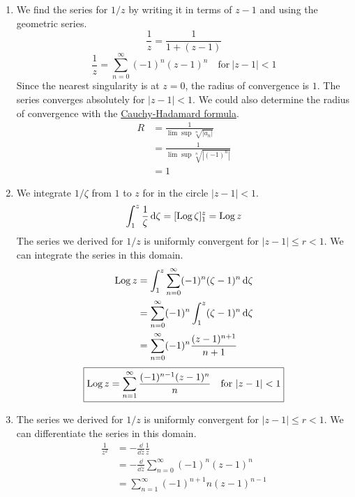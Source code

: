 {\begin{Solution}
  \label{solution taylor series 1/z}
  \begin{enumerate}
  \item
    We find the series for $1/z$ by writing it in terms of $z-1$ and using
    the geometric series.
    \[
    \frac{1}{z} = \frac{1}{1 + (z - 1)}
    \]
    \[
    \boxed{
      \frac{1}{z} = \sum_{n = 0}^\infty (-1)^n (z - 1)^n \quad \mathrm{for}\ |z-1| < 1
      }
    \]
    Since the nearest singularity is at $z = 0$, the radius of convergence 
    is $1$.  The series converges absolutely for $|z-1| < 1$.  We could 
    also determine the radius of convergence with the 
    \hyperref[result cauchy hadamard formula]{Cauchy-Hadamard formula}.
    \begin{align*}
      R
      &= \frac{ 1 }{ \lim \sup \sqrt[n]{|a_n|} } 
      \\
      &= \frac{ 1 }{ \lim \sup \sqrt[n]{|(-1)^n|} } 
      \\
      &= 1
    \end{align*}
  \item
    We integrate $1/\zeta$ from $1$ to $z$ for in the circle $|z - 1| < 1$.
    \[
    \int_1^z \frac{1}{\zeta}\,\mathrm{d} \zeta = [ \mathop{\mathrm{Log}}\nolimits \zeta ]_1^z = \mathop{\mathrm{Log}}\nolimits z
    \]
    The series we derived for $1/z$ is uniformly convergent for 
    $|z-1| \leq r < 1$.  We can integrate the series in this domain.
    \begin{align*}
      \mathop{\mathrm{Log}}\nolimits z
      &= \int_1^z \sum_{n = 0}^\infty (-1)^n (\zeta - 1)^n\,\mathrm{d} \zeta
      \\
      &= \sum_{n = 0}^\infty (-1)^n \int_1^z (\zeta - 1)^n\,\mathrm{d} \zeta
      \\
      &= \sum_{n = 0}^\infty (-1)^n \frac{(z - 1)^{n+1}}{n + 1}
    \end{align*}
    \[
    \boxed{
      \mathop{\mathrm{Log}}\nolimits z = \sum_{n = 1}^\infty \frac{ (-1)^{n-1} (z - 1)^n }{ n } 
      \quad \mathrm{for}\ |z - 1| < 1
      }
    \]
  \item 
    The series we derived for $1/z$ is uniformly convergent for 
    $|z - 1| \leq r < 1$.  We can differentiate the series in this domain.
    \begin{align*}
      \frac{1}{z^2}
      &= - \frac{\dd}{\dd z} \frac{1}{z}
      \\
      &= - \frac{\dd}{\dd z} \sum_{n = 0}^\infty (-1)^n (z - 1)^n
      \\
      &= \sum_{n = 1}^\infty (-1)^{n+1} n (z - 1)^{n-1}
    \end{align*}

\end{enumerate}
\end{Solution}}
